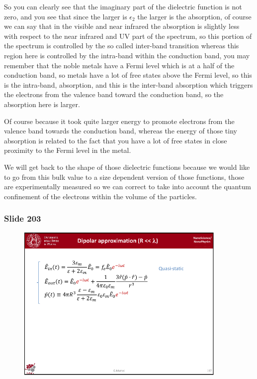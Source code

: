 \documentclass[../main/main.tex]{subfiles}
\begin{document}
So you can clearly see that the imaginary part of the dielectric function is not zero, and you see that since the larger is $\epsilon_2$ the larger is the absorption, of course we can say that in the visible and near infrared the absorption is slightly less with respect to the near infrared and UV part of the spectrum, so this portion of the spectrum is controlled by the so called inter-band transition whereas this region here is controlled by the intra-band within the conduction band, you may remember that the noble metals have a Fermi level which is at a half of the conduction band, so metals have a lot of free states above the Fermi level, so this is the intra-band, absorption, and this is the inter-band absorption which triggers the electrons from the valence band toward the conduction band, so the absorption here is larger.

Of course because it took quite larger energy to promote electrons from the valence band towards the conduction band, whereas the energy of those tiny absorption is related to the fact that you have a lot of free states in close proximity to the Fermi level in the metal.

We will get back to the shape of those dielectric functions because we would like to go from this bulk value to a size dependent version of those functions, those are experimentally measured so we can correct to take into account the quantum confinement of the electrons within the volume of the particles.





\newpage

\subsubsection{Slide 203}

\begin{figure}[h!]
\centering
\includegraphics[page=7,width=0.9\textwidth]{../lessons/pdf_file/12_lesson.pdf}
\end{figure}
\end{document}
